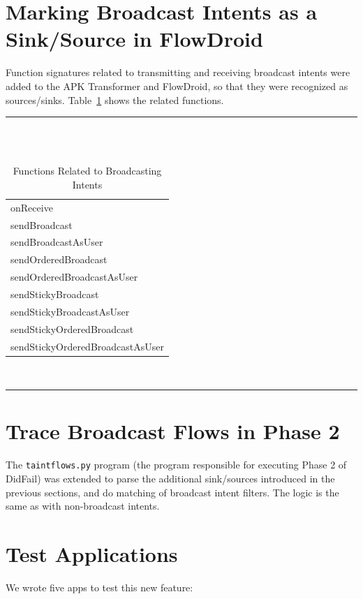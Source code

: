 \section{Marking Broadcast Intents as a Sink/Source in FlowDroid}
Function signatures related to transmitting and receiving broadcast intents were added to the APK Transformer and FlowDroid, so that they were recognized as sources/sinks. Table~\ref{fnc_bcast} shows the related functions.
\begin{table}[!h]
\renewcommand{\arraystretch}{1.3}
\caption{Functions Related to Broadcasting Intents}
\label{fnc_bcast}
\centering
\rule{0.55\textwidth}{0.75pt}
\\
\tt
\begin{tabular}{l}
onReceive \\
sendBroadcast \\
sendBroadcastAsUser \\
sendOrderedBroadcast \\
sendOrderedBroadcastAsUser \\
sendStickyBroadcast \\
sendStickyBroadcastAsUser \\
sendStickyOrderedBroadcast \\
sendStickyOrderedBroadcastAsUser \\
\end{tabular}
\\
\rule{0.55\textwidth}{0.75pt}
\end{table}

\section{Trace Broadcast Flows in Phase 2}
The \texttt{taintflows.py} program (the program responsible for executing Phase 2 of DidFail) was extended to parse the additional sink/sources introduced in the previous sections, and do matching of broadcast intent filters. The logic is the same as with non-broadcast intents.

\section{Test Applications}
We wrote five apps to test this new feature:

